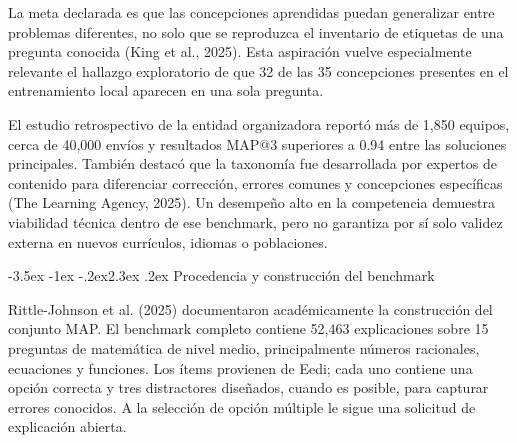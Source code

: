 \documentclass[11pt,oneside,openany]{book}
\makeatletter
\renewcommand\section{\@startsection{section}{1}{\z@}%
  {-3.5ex \@plus -1ex \@minus -.2ex}{2.3ex \@plus .2ex}%
  {\normalfont\Large\sffamily\bfseries\color{AzulMedio}}}
\makeatother
\begin{document}
La meta declarada es que las concepciones aprendidas puedan generalizar entre
problemas diferentes, no solo que se reproduzca el inventario de etiquetas de
una pregunta conocida (King et al., 2025). Esta aspiración vuelve especialmente
relevante el hallazgo exploratorio de que 32 de las 35 concepciones presentes
en el entrenamiento local aparecen en una sola pregunta.

El estudio retrospectivo de la entidad organizadora reportó más de 1,850
equipos, cerca de 40,000 envíos y resultados MAP@3 superiores a 0.94 entre las
soluciones principales. También destacó que la taxonomía fue desarrollada por
expertos de contenido para diferenciar corrección, errores comunes y
concepciones específicas (The Learning Agency, 2025). Un desempeño alto en la
competencia demuestra viabilidad técnica dentro de ese benchmark, pero no
garantiza por sí solo validez externa en nuevos currículos, idiomas o
poblaciones.

\section{Procedencia y construcción del benchmark}

Rittle-Johnson et al. (2025) documentaron académicamente la construcción del
conjunto MAP. El benchmark completo contiene 52,463 explicaciones sobre 15
preguntas de matemática de nivel medio, principalmente números racionales,
ecuaciones y funciones. Los ítems provienen de Eedi; cada uno contiene una
opción correcta y tres distractores diseñados, cuando es posible, para capturar
errores conocidos. A la selección de opción múltiple le sigue una solicitud de
explicación abierta.
\end{document}
